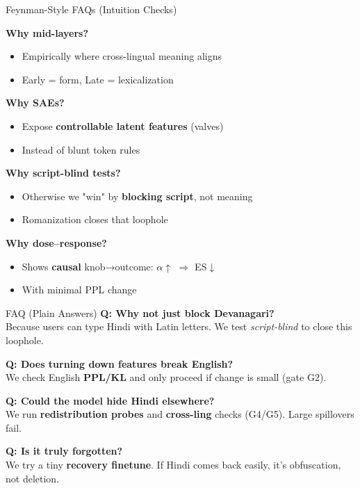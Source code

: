 \documentclass[aspectratio=169]{beamer}
\newcommand{\highlight}[1]{\textcolor{mOrange}{\textbf{#1}}}
\newcommand{\success}[1]{\textcolor{mGreen}{\textbf{#1}}}
\newcommand{\warning}[1]{\textcolor{mRed}{\textbf{#1}}}
\begin{document}
\begin{frame}{Feynman-Style FAQs (Intuition Checks)}

\textbf{Why mid-layers?}
\begin{itemize}
  \item Empirically where cross-lingual meaning aligns
  \item Early = form, Late = lexicalization
\end{itemize}

\vspace{2mm}

\textbf{Why SAEs?}
\begin{itemize}
  \item Expose \highlight{controllable latent features} (valves)
  \item Instead of blunt token rules
\end{itemize}

\vspace{2mm}

\textbf{Why script-blind tests?}
\begin{itemize}
  \item Otherwise we "win" by \warning{blocking script}, not meaning
  \item Romanization closes that loophole
\end{itemize}

\vspace{2mm}

\textbf{Why dose–response?}
\begin{itemize}
  \item Shows \success{causal} knob→outcome: $\alpha\uparrow$ $\Rightarrow$  ES$\downarrow$
  \item With minimal PPL change
\end{itemize}

\end{frame}

\begin{frame}{FAQ (Plain Answers)}
\small
\textbf{Q: Why not just block Devanagari?}\\
Because users can type Hindi with Latin letters. We test \emph{script\hyp blind} to close this loophole.

\vspace{1mm}
\textbf{Q: Does turning down features break English?}\\
We check English \textbf{PPL/KL} and only proceed if change is small (gate G2).

\vspace{1mm}
\textbf{Q: Could the model hide Hindi elsewhere?}\\
We run \textbf{redistribution probes} and \textbf{cross\hyp ling} checks (G4/G5). Large spillovers fail.

\vspace{1mm}
\textbf{Q: Is it truly forgotten?}\\
We try a tiny \textbf{recovery finetune}. If Hindi comes back easily, it's obfuscation, not deletion.
\end{frame}
\end{document}
